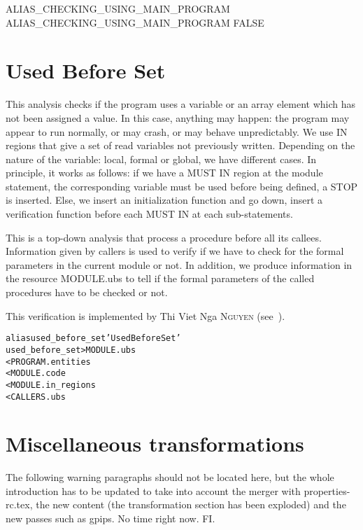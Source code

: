 \documentclass[a4paper]{report}
\newenvironment{PipsMake}{\begin{alltt}}{\end{alltt}}
\newenvironment{PipsPass}[1]{\label{pass:#1}}{}
\begin{document}
\begin{PipsProp}{ALIAS_CHECKING_USING_MAIN_PROGRAM}
ALIAS_CHECKING_USING_MAIN_PROGRAM FALSE
\end{PipsProp}

\section{Used Before Set}
\label{subsection-used-before_set}

\begin{PipsPass}{used_before_set}
This analysis checks if the program uses a variable or an array element
which has not been assigned a value. In this case, anything may happen:
the program may appear to run normally, or may
crash, or may behave unpredictably. We use IN regions
that give a set of read variables not previously written. Depending on the
nature of the variable: local, formal or global, we have different
cases. In principle, it
works as follows: if we have a MUST IN region at the module statement, the
corresponding variable must be used before
being defined, a STOP is inserted. Else, we insert an initialization
function and go down, insert a verification function before each MUST IN
at each sub-statements.

This is a top-down analysis that process a procedure before all its
callees. Information given by callers is used to verify if we have to
check for the formal parameters in the current module or not. In addition,
we produce information in the resource MODULE.ubs to tell if the formal
parameters of the called procedures have to be checked or not.

This verification is implemented by Thi Viet Nga \textsc{Nguyen} (see~\cite{Ngu02}).
\end{PipsPass}

\begin{PipsMake}
alias used_before_set 'Used Before Set'
used_before_set   > MODULE.ubs
        < PROGRAM.entities
        < MODULE.code
        < MODULE.in_regions
        < CALLERS.ubs
\end{PipsMake}


\section{Miscellaneous transformations}

The following warning paragraphs should not be located here, but the
whole introduction has to be updated to take into account the merger
with properties-rc.tex, the new content (the transformation section
has been exploded) and the new passes such as gpips. No time right
now. FI.
\end{document}
